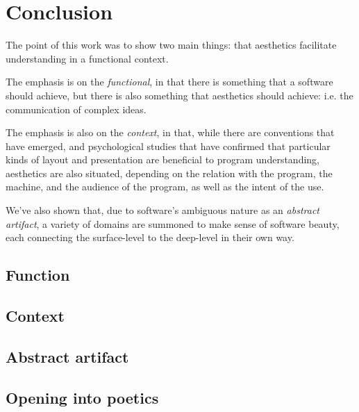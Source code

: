 \chapter{Conclusion} %

The point of this work was to show two main things: that aesthetics facilitate understanding in a functional context.

The emphasis is on the \emph{functional}, in that there is something that a software should achieve, but there is also something that aesthetics should achieve: i.e. the communication of complex ideas.

The emphasis is also on the \emph{context}, in that, while there are conventions that have emerged, and psychological studies that have confirmed that particular kinds of layout and presentation are beneficial to program understanding, aesthetics are also situated, depending on the relation with the program, the machine, and the audience of the program, as well as the intent of the use.

We've also shown that, due to software's ambiguous nature as an \emph{abstract artifact}, a variety of domains are summoned to make sense of software beauty, each connecting the surface-level to the deep-level in their own way.

\section{Function} %

\section{Context} %

\section{Abstract artifact} %

\section{Opening into poetics} %